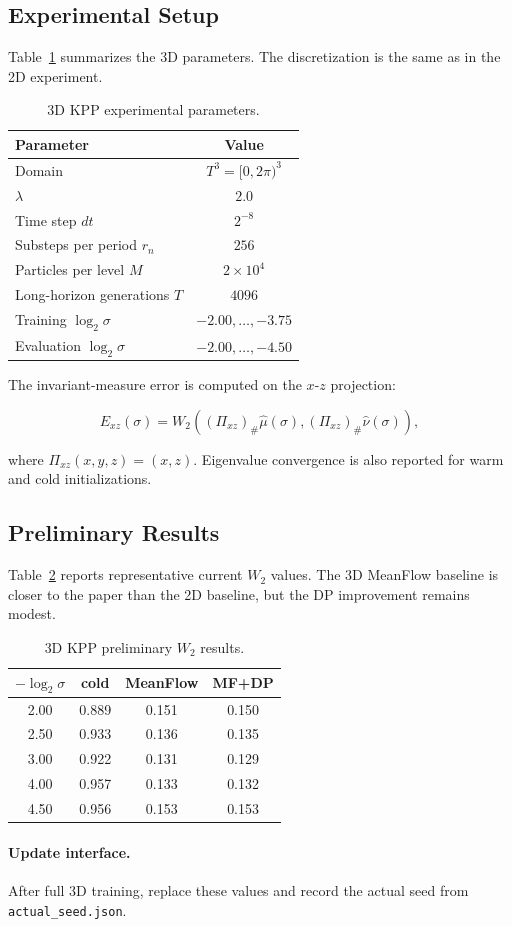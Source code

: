 \documentclass[11pt]{article}
\begin{document}
\subsection{Experimental Setup}

Table~\ref{tab:3d_setup} summarizes the 3D parameters. The discretization is
the same as in the 2D experiment.

\begin{table}[htbp]
\centering
\caption{3D KPP experimental parameters.}
\label{tab:3d_setup}
\begin{tabular}{lc}
\toprule
Parameter & Value \\
\midrule
Domain & \(T^3=[0,2\pi)^3\) \\
\(\lambda\) & \(2.0\) \\
Time step \(dt\) & \(2^{-8}\) \\
Substeps per period \(r_n\) & \(256\) \\
Particles per level \(M\) & \(2\times 10^4\) \\
Long-horizon generations \(T\) & \(4096\) \\
Training \(\log_2\sigma\) & \(-2.00,\ldots,-3.75\) \\
Evaluation \(\log_2\sigma\) & \(-2.00,\ldots,-4.50\) \\
\bottomrule
\end{tabular}
\end{table}

The invariant-measure error is computed on the \(x\)-\(z\) projection:

\begin{equation}
E_{xz}(\sigma)=W_2\left((\Pi_{xz})_\#\hat\mu(\sigma),
(\Pi_{xz})_\#\hat\nu(\sigma)\right),
\end{equation}

where \(\Pi_{xz}(x,y,z)=(x,z)\). Eigenvalue convergence is also reported for
warm and cold initializations.

\subsection{Preliminary Results}

Table~\ref{tab:3d} reports representative current \(W_2\) values. The 3D
MeanFlow baseline is closer to the paper than the 2D baseline, but the DP
improvement remains modest.

\begin{table}[htbp]
\centering
\caption{3D KPP preliminary \(W_2\) results.}
\label{tab:3d}
\begin{tabular}{cccc}
\toprule
\(-\log_2\sigma\) & cold & MeanFlow & MF+DP \\
\midrule
2.00 & 0.889 & 0.151 & 0.150 \\
2.50 & 0.933 & 0.136 & 0.135 \\
3.00 & 0.922 & 0.131 & 0.129 \\
4.00 & 0.957 & 0.133 & 0.132 \\
4.50 & 0.956 & 0.153 & 0.153 \\
\bottomrule
\end{tabular}
\end{table}

\paragraph{Update interface.}
After full 3D training, replace these values and record the actual seed from
\texttt{actual\_seed.json}.
\end{document}
